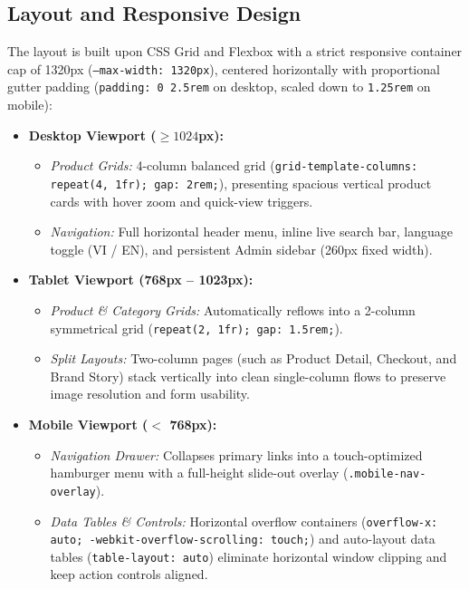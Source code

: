 \documentclass[12pt,a4paper,oneside]{report}
\begin{document}
\subsection{Layout and Responsive Design}
The layout is built upon CSS Grid and Flexbox with a strict responsive container cap of 1320px (\texttt{--max-width: 1320px}), centered horizontally with proportional gutter padding (\texttt{padding: 0 2.5rem} on desktop, scaled down to \texttt{1.25rem} on mobile):
\begin{itemize}[leftmargin=1.2cm]
    \item \textbf{Desktop Viewport ($\ge 1024$px):}
    \begin{itemize}[nosep]
        \item \textit{Product Grids:} 4-column balanced grid (\texttt{grid-template-columns: repeat(4, 1fr); gap: 2rem;}), presenting spacious vertical product cards with hover zoom and quick-view triggers.
        \item \textit{Navigation:} Full horizontal header menu, inline live search bar, language toggle (VI / EN), and persistent Admin sidebar (260px fixed width).
    \end{itemize}
    \item \textbf{Tablet Viewport (768px -- 1023px):}
    \begin{itemize}[nosep]
        \item \textit{Product \& Category Grids:} Automatically reflows into a 2-column symmetrical grid (\texttt{repeat(2, 1fr); gap: 1.5rem;}).
        \item \textit{Split Layouts:} Two-column pages (such as Product Detail, Checkout, and Brand Story) stack vertically into clean single-column flows to preserve image resolution and form usability.
    \end{itemize}
    \item \textbf{Mobile Viewport ($<$ 768px):}
    \begin{itemize}[nosep]
        \item \textit{Navigation Drawer:} Collapses primary links into a touch-optimized hamburger menu with a full-height slide-out overlay (\texttt{.mobile-nav-overlay}).
        \item \textit{Data Tables \& Controls:} Horizontal overflow containers (\texttt{overflow-x: auto; -webkit-overflow-scrolling: touch;}) and auto-layout data tables (\texttt{table-layout: auto}) eliminate horizontal window clipping and keep action controls aligned.
    \end{itemize}
\end{itemize}
\end{document}
